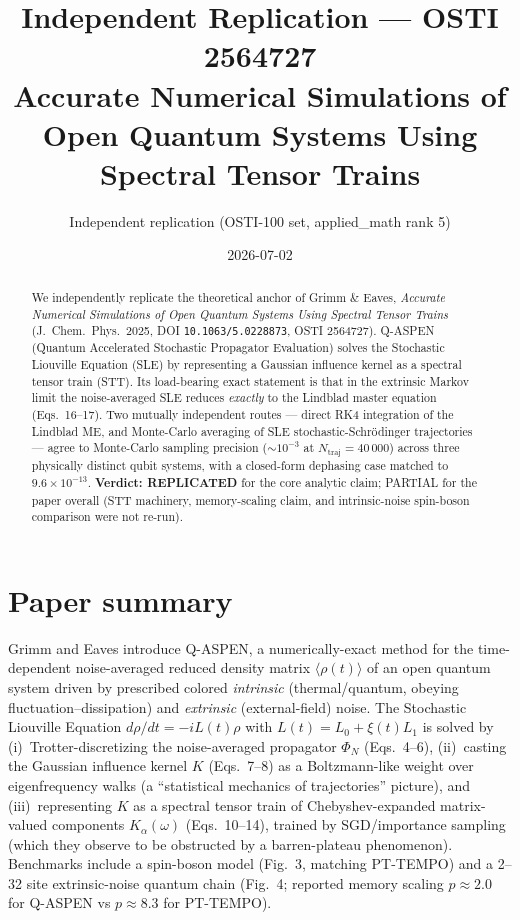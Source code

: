\documentclass[11pt]{article}
\title{Independent Replication --- OSTI 2564727 \\
\large Accurate Numerical Simulations of Open Quantum Systems Using Spectral Tensor Trains}
\author{Independent replication (OSTI-100 set, applied\_math rank 5)}
\date{2026-07-02}
\begin{document}
\maketitle

\begin{abstract}
We independently replicate the theoretical anchor of Grimm \& Eaves,
\emph{Accurate Numerical Simulations of Open Quantum Systems Using Spectral Tensor Trains}
(J.\ Chem.\ Phys.\ 2025, DOI \texttt{10.1063/5.0228873}, OSTI 2564727).
Q-ASPEN (Quantum Accelerated Stochastic Propagator Evaluation) solves the
Stochastic Liouville Equation (SLE) by representing a Gaussian influence
kernel as a spectral tensor train (STT).  Its load-bearing exact statement is that
in the extrinsic Markov limit the noise-averaged SLE reduces \emph{exactly}
to the Lindblad master equation (Eqs.~16--17).  Two mutually independent routes
--- direct RK4 integration of the Lindblad ME, and Monte-Carlo averaging of
SLE stochastic-Schr\"odinger trajectories --- agree to Monte-Carlo sampling
precision ($\sim 10^{-3}$ at $N_{\mathrm{traj}}{=}40\,000$) across three
physically distinct qubit systems, with a closed-form dephasing case matched to
$9.6\times 10^{-13}$.  \textbf{Verdict: REPLICATED} for the core analytic claim;
PARTIAL for the paper overall (STT machinery, memory-scaling claim, and
intrinsic-noise spin-boson comparison were not re-run).
\end{abstract}

\section{Paper summary}

Grimm and Eaves introduce Q-ASPEN, a numerically-exact method for the
time-dependent noise-averaged reduced density matrix
$\langle \rho(t)\rangle$ of an open quantum system driven by prescribed colored
\emph{intrinsic} (thermal/quantum, obeying fluctuation--dissipation) and
\emph{extrinsic} (external-field) noise.  The Stochastic Liouville Equation
$d\rho/dt = -i L(t)\rho$ with $L(t)=L_0+\xi(t)L_1$ is solved by
(i)~Trotter-discretizing the noise-averaged propagator $\Phi_N$ (Eqs.~4--6),
(ii)~casting the Gaussian influence kernel $K$ (Eqs.~7--8) as a Boltzmann-like
weight over eigenfrequency walks (a ``statistical mechanics of trajectories''
picture), and (iii)~representing $K$ as a spectral tensor train
of Chebyshev-expanded matrix-valued components $K_\alpha(\omega)$
(Eqs.~10--14), trained by SGD/importance sampling (which they observe to be
obstructed by a barren-plateau phenomenon).  Benchmarks include a spin-boson
model (Fig.~3, matching PT-TEMPO) and a 2--32 site extrinsic-noise quantum
chain (Fig.~4; reported memory scaling $p\!\approx\!2.0$ for Q-ASPEN vs
$p\!\approx\!8.3$ for PT-TEMPO).
\end{document}
